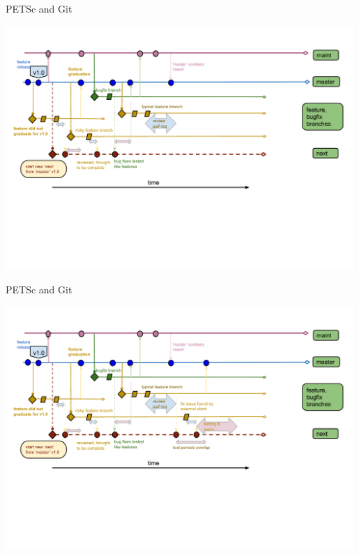 \begin{frame}{PETSc and Git}
  \begin{center}
    \includegraphics[width=0.99\textwidth]{figures/gitworkflows-75}
  \end{center}
\end{frame}

\begin{frame}{PETSc and Git}
  \begin{center}
    \includegraphics[width=0.99\textwidth]{figures/gitworkflows-80}
  \end{center}
\end{frame}

